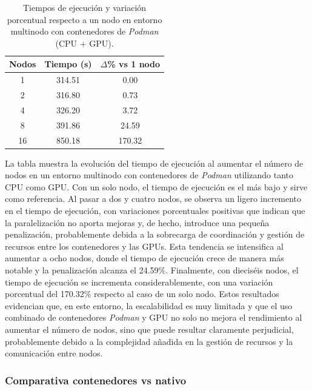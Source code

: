 \begin{table}[ht]
    \centering
    \begin{tabular}{|c|c|c|}
        \hline
        \textbf{Nodos} & \textbf{Tiempo (s)} & \textbf{$\Delta$\% vs 1 nodo} \\
        \hline
        1              & 314.51              & 0.00                          \\
        2              & 316.80              & 0.73                          \\
        4              & 326.20              & 3.72                          \\
        8              & 391.86              & 24.59                         \\
        16             & 850.18              & 170.32                        \\
        \hline
    \end{tabular}
    \caption{Tiempos de ejecución y variación porcentual respecto a un nodo en entorno multinodo con contenedores de \textit{Podman} (CPU + GPU).}
    \label{tab:multi-node_ubuntu_\textit{Podman}_gpu}
\end{table}

La tabla muestra la evolución del tiempo de ejecución al aumentar el número de nodos en un entorno multinodo con contenedores de \textit{Podman} utilizando tanto CPU como GPU. Con un solo nodo, el tiempo de ejecución es el más bajo y sirve como referencia. Al pasar a dos y cuatro nodos, se observa un ligero incremento en el tiempo de ejecución, con variaciones porcentuales positivas que indican que la paralelización no aporta mejoras y, de hecho, introduce una pequeña penalización, probablemente debida a la sobrecarga de coordinación y gestión de recursos entre los contenedores y las GPUs. Esta tendencia se intensifica al aumentar a ocho nodos, donde el tiempo de ejecución crece de manera más notable y la penalización alcanza el 24.59\%. Finalmente, con dieciséis nodos, el tiempo de ejecución se incrementa considerablemente, con una variación porcentual del 170.32\% respecto al caso de un solo nodo. Estos resultados evidencian que, en este entorno, la escalabilidad es muy limitada y que el uso combinado de contenedores \textit{Podman} y GPU no solo no mejora el rendimiento al aumentar el número de nodos, sino que puede resultar claramente perjudicial, probablemente debido a la complejidad añadida en la gestión de recursos y la comunicación entre nodos.

\subsubsection{Comparativa contenedores vs nativo}

